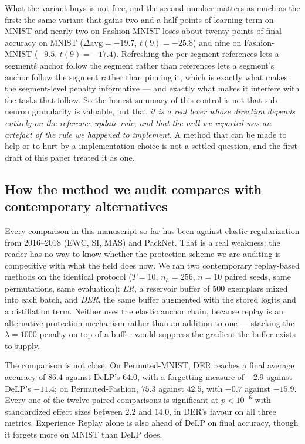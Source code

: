 \documentclass[10pt]{article}
\begin{document}
What the variant buys is not free, and the second number matters as much
as the first: the same variant that gains two and a half points of
learning term on MNIST and nearly two on Fashion-MNIST loses about twenty
points of final accuracy on MNIST ($\Delta\mathrm{avg}=-19.7$,
$t(9)=-25.8$) and nine on Fashion-MNIST ($-9.5$, $t(9)=-17.4$). Refreshing the per-segment
references lets a segment\'s anchor follow the segment rather than
references lets a segment's anchor follow the segment rather than
pinning it, which is exactly what makes the segment-level penalty
informative --- and exactly what makes it interfere with the tasks that
follow. So the honest summary of this control is not that
sub-neuron granularity is valuable, but that \emph{it is a real lever
whose direction depends entirely on the reference-update rule, and that
the null we reported was an artefact of the rule we happened to
implement}. A method that can be made to help or to hurt by a
implementation choice is not a settled question, and the first draft of
this paper treated it as one.

\subsection{How the method we audit compares with contemporary
alternatives}
\label{sec:ctrl-baselines}

Every comparison in this manuscript so far has been against elastic
regularization from 2016--2018 (EWC, SI, MAS) and PackNet. That is a
real weakness: the reader has no way to know whether the protection
scheme we are auditing is competitive with what the field does now. We
ran two contemporary replay-based methods on the identical protocol
($T=10$, $n_h{=}256$, $n=10$ paired seeds, same permutations, same
evaluation): \emph{ER}, a reservoir buffer of $500$ exemplars mixed into
each batch, and \emph{DER}, the same buffer augmented with the stored
logits and a distillation term. Neither uses the elastic anchor chain,
because replay is an alternative protection mechanism rather than an
addition to one --- stacking the $\lambda=1000$ penalty on top of a
buffer would suppress the gradient the buffer exists to supply.

The comparison is not close. On Permuted-MNIST, DER reaches a final
average accuracy of $86.4$ against DeLP's $64.0$, with a forgetting
measure of $-2.9$ against DeLP's $-11.4$; on Permuted-Fashion, $75.3$
against $42.5$, with $-0.7$ against $-15.9$. Every one of the twelve
paired comparisons is significant at $p<10^{-6}$ with standardized effect
sizes between $2.2$ and $14.0$, in DER's favour on all three metrics.
Experience Replay alone is also ahead of DeLP on final accuracy, though
it forgets more on MNIST than DeLP does.
\end{document}

